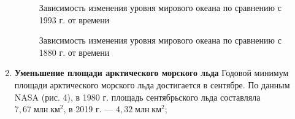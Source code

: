 \documentclass[a4paper,14pt]{article}
\begin{document}
\begin{enumerate}
\begin{figure}[h!]
\caption{Зависимость изменения уровня мирового океана по сравнению с 1993 г. от времени}
\end{figure}

\begin{figure}[h!]
\caption{Зависимость изменения уровня мирового океана по сравнению с 1880 г. от времени}
\end{figure}

\item \textbf{Уменьшение площади арктического морского льда}
\newline
Годовой минимум площади арктического морского льда достигается в сентябре. По данным NASA (рис. 4), в 1980 г. площадь сентябрьского льда составляла $7,67 \; \text{млн} \; \text{км}^{2}$, в 2019 г. --- $4,32 \; \text{млн} \; \text{км}^{2}$; 


\end{enumerate}
\end{document}
